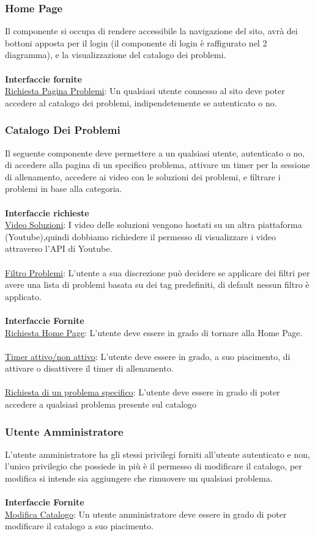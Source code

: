\documentclass[11pt, a4paper]{article}
\theoremstyle{definition} %
\begin{document}
\subsubsection{Home Page}
Il componente si occupa di rendere accessibile la navigazione del sito, avrà dei bottoni apposta per il login (il componente di login è raffigurato nel 2 diagramma), e la visualizzazione del catalogo dei problemi.
\\\\\textbf{Interfaccie fornite}\\
\underline{Richiesta Pagina Problemi}: Un qualsiasi utente connesso al sito deve poter accedere al catalogo dei problemi, indipendetemente se autenticato o no.
\subsubsection{Catalogo Dei Problemi}
Il seguente componente deve permettere a un qualsiasi utente, autenticato o no, di accedere alla pagina di un specifico problema, attivare un timer per la sessione di allenamento,
accedere ai video con le soluzioni dei problemi, e filtrare i problemi in base alla categoria.
\\\\\textbf{Interfaccie richieste}\\
\underline{Video Soluzioni}: I video delle soluzioni vengono hostati su un altra piattaforma (Youtube),quindi dobbiamo richiedere il permesso di visualizzare i video attraverso l'API di Youtube.
\\\\
\underline{Filtro Problemi}: L'utente a sua discrezione può decidere se applicare dei filtri per avere una lista di problemi basata su dei tag predefiniti, di default nessun filtro è applicato.
\\\\
\textbf{Interfaccie Fornite}
\\
\underline{Richiesta Home Page}: L'utente deve essere in grado di tornare alla Home Page.
\\\\
\underline{Timer attivo/non attivo}: L'utente deve essere in grado, a suo piacimento, di attivare o disattivere il timer di allenamento.
\\\\
\underline{Richiesta di un problema specifico}: L'utente deve essere in grado di poter accedere a qualsiasi problema presente sul catalogo

\subsubsection{Utente Amministratore}
L'utente amministratore ha gli stessi privilegi forniti all'utente autenticato e non, l'unico privilegio che possiede in più è il permesso di modificare il catalogo,
per modifica si intende sia aggiungere che rimuovere un qualsiasi problema.
\\\\\textbf{Interfaccie Fornite}\\
\underline{Modifica Catalogo}: Un utente amministratore deve essere in grado di poter modificare il catalogo a suo piacimento.
\end{document}

